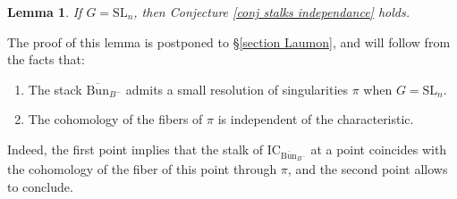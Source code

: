 \documentclass[11pt]{amsart}
\theoremstyle{plain}
\newtheorem{lem}[thm]{Lemma}
\theoremstyle{remark}
\newtheorem{rem}[thm]{Remark}
\numberwithin{equation}{section}
\begin{document}
	\begin{lem}\label{lem kuznetsov}
		If $G=\mathrm{SL}_n$, then Conjecture \ref{conj stalks independance} holds.
	\end{lem}
	The proof of this lemma is postponed to §\ref{section Laumon}, and will follow from the facts that: 
	\begin{enumerate}
		\item The stack $\overline{\mathrm{Bun}}_{B^-}$ admits a small resolution of singularities $\pi$ when $G=\mathrm{SL}_n$.
		\item The cohomology of the fibers of $\pi$ is independent of the characteristic.
	\end{enumerate} 
	Indeed, the first point implies that the stalk of $\mathrm{IC}_{\overline{\mathrm{Bun}}_{B^-}}$ at a point coincides with the cohomology of the fiber of this point through $\pi$, and the second point allows to conclude.
	
	
	
	
	
	
\end{document}
